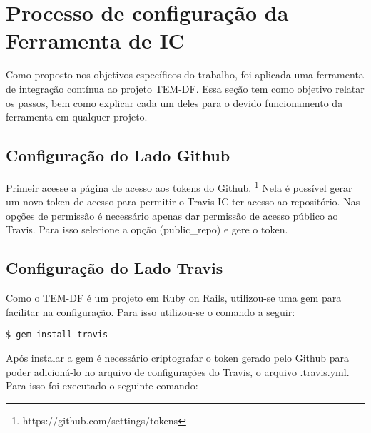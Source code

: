 \pagestyle{empty}

\section{Processo de configuração da Ferramenta de IC}

Como proposto nos objetivos específicos do trabalho, foi aplicada uma ferramenta de integração contínua ao projeto TEM-DF. Essa seção tem como objetivo relatar os passos, bem como
explicar cada um deles para o devido funcionamento da ferramenta em qualquer projeto.

\subsection{Configuração do Lado Github}

Primeir acesse a página de acesso aos tokens do \href{https://github.com/settings/tokens}{Github.}%
\footnote{https://github.com/settings/tokens}
Nela é possível gerar um novo token de acesso para permitir o Travis IC ter acesso ao repositório. Nas opções de permissão é necessário apenas dar permissão de acesso público ao Travis. Para isso selecione a opção (public\_repo) e gere o token.

\subsection{Configuração do Lado Travis}

Como o TEM-DF é um projeto em Ruby on Rails, utilizou-se uma gem para facilitar na configuração. Para isso utilizou-se o comando a seguir:

\begin{lstlisting}
$ gem install travis
\end{lstlisting}

Após instalar a gem é necessário criptografar o token gerado pelo Github para poder adicioná-lo no arquivo de configurações do Travis, o arquivo .travis.yml. Para isso foi executado o seguinte comando:

